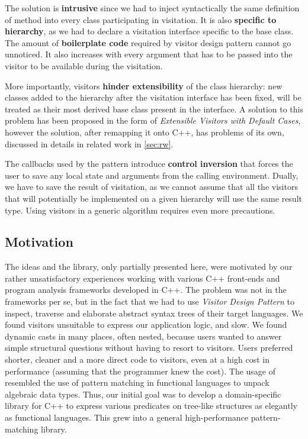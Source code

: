 The solution is {\bf intrusive} since we had to inject syntactically the same 
definition of  method into every class participating in visitation. 
It is also {\bf specific to hierarchy}, as we had to declare a visitation 
interface specific to the base class. The amount of {\bf boilerplate code} 
required by visitor design pattern cannot go unnoticed. It also increases with 
every argument that has to be passed into the visitor to be available during the 
visitation.

More importantly, visitors {\bf hinder extensibility} of the class hierarchy: 
new classes added to the hierarchy after the visitation interface has been 
fixed, will be treated as their most derived base class present in the interface.
A solution to this problem has been proposed in the form of \emph{Extensible 
Visitors with Default Cases}\cite[]{Zenger:2001}, however the 
solution, after remapping it onto C++, has problems of its own, discussed in 
details in related work in \textsection\ref{sec:rw}.

The  callbacks used by the pattern introduce {\bf control inversion} 
that forces the user to save any local state and arguments from the calling 
environment. Dually, we have to save the result of visitation, as we cannot 
assume that all the visitors that will potentially be implemented on a given 
hierarchy will use the same result type. Using visitors in a generic algorithm 
requires even more precautions.

\subsection{Motivation}

The ideas and the library, only partially presented here, were motivated by our 
rather unsatisfactory experiences working with various C++ front-ends and 
program analysis frameworks developed in C++\cite{Pivot09,Phoenix,Clang,Lise}. 
The problem was not in the frameworks per se, but in the fact that we had to use
\emph{Visitor Design Pattern}\cite{DesignPatterns1993} to inspect, traverse and 
elaborate abstract syntax trees of their target languages. We found visitors 
unsuitable to express our application logic, and slow. We found dynamic casts in 
many places, often nested, because users wanted to answer simple structural 
questions without having to resort to visitors. Users preferred shorter, cleaner 
and a more direct code to visitors, even at a high cost in performance (assuming 
that the programmer knew the cost). The usage of  resembled 
the use of pattern matching in functional languages to unpack algebraic data 
types. Thus, our initial goal was to develop a domain-specific library for C++ 
to express various predicates on tree-like structures as elegantly as functional 
languages. This grew into a general high-performance pattern-matching library.

